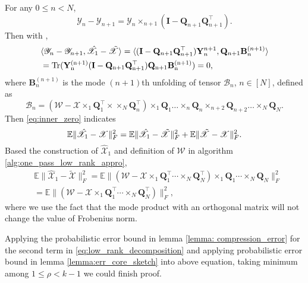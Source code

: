 For any $0\le n< N$, 
\begin{equation}
\mathscr{Y}_n-\mathscr{Y}_{n+1} = \mathscr{Y}_{n} \times_{n+1} (\mathbf{I} - \mathbf{Q}_{n+1}\mathbf{Q}^\top_{n+1}).
\end{equation}
Then with \label{eq:F_norm_equivalent}, 
\begin{equation}
\begin{aligned}
&\langle \mathscr{Y}_n-\mathscr{Y}_{n+1}, \hat{\mathscr{X}}_1-\tilde{\mathscr{X}}\rangle = \langle (\mathbf{I} - \mathbf{Q}_{n+1}\mathbf{Q}^\top_{n+1}) \mathbf{Y}_{n}^{n+1},  \mathbf{Q}_{n+1}\mathbf{B}_n^{(n+1)}\rangle \\
& = \rm{Tr}(\mathbf{Y}_{n}^{(n+1)} (\mathbf{I} - \mathbf{Q}_{n+1}\mathbf{Q}^\top_{n+1})\mathbf{Q}_{n+1}\mathbf{B}_n^{(n+1)} )=0 , 
\end{aligned}
\end{equation}
where $\mathbf{B}_n^{(n+1)}$ is the mode $(n+1)$th unfolding of tensor $\mathscr{B}_n$, $n \in [N]$, defined as 
\begin{equation}
\mathscr{B}_n = (\mathscr{W}-\mathscr{X}\times_1 \mathbf{Q}_1^\top \times \times_N \mathbf{Q}_n^\top)  \times_1 \mathbf{Q}_1 \dots \times_n \mathbf{Q}_n \times_{n+2}  \mathbf{Q}_{n+2} \dots \times_N   \mathbf{Q}_{N}. 
\end{equation}
Then \eqref{eq:inner_zero} indicates 
\begin{equation}
\label{eq:low_rank_decomposition}
 \mathbb{E}\| \hat{\mathscr{X}}_1 - \mathscr{X} \|_F^2 = \mathbb{E}\| \hat{\mathscr{X}}_1 - \Tilde{\mathscr{X}}\|_F^2 + \mathbb{E} \|\Tilde{\mathscr{X}} - \mathscr{X} \|_F^2. 
\end{equation}
Based the construction of $\hat{\mathscr{X}}_1$ and definition of $\mathscr{W}$ in algorithm \ref{alg:one_pass_low_rank_appro}, 
\begin{equation}
\begin{aligned}
&\mathbb{E} \|\hat{\mathscr{X}}_1 - \tilde{\mathscr{X}}\|^2_F = 
\mathbb{E}\|(\mathscr{W} - \mathscr{X}\times_1 \mathbf{Q}_1^\top \cdots \times_N \mathbf{Q}^\top_N)\times_1 \mathbf{Q}_1\cdots \times_N \mathbf{Q}_N \|^2_F\\
& = \mathbb{E}\|(\mathscr{W} - \mathscr{X}\times_1 \mathbf{Q}_1^\top \cdots \times_N \mathbf{Q}^\top_N)\|_F^2,  \end{aligned}
\end{equation}
where we use the fact that the mode product with an orthogonal matrix will not change the value of Frobenius norm. 

Applying the probabilistic error bound in lemma \ref{lemma: compression_error} for the second term in \eqref{eq:low_rank_decomposition} and applying probabilistic error bound in lemma \ref{lemma:err_core_sketch} into above equation, 
taking minimum among $1\le \rho <k-1$ we could finish proof. 
